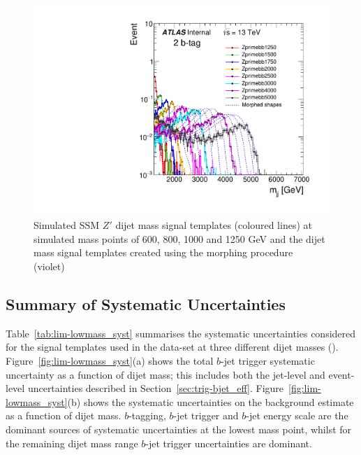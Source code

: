\begin{figure}[!ht]
\begin{center}
  \includegraphics[width=0.45\linewidth, angle=0]{figs/Dibjet/LowMass/lim-morphing.pdf} 
\end{center}
\caption[Simulated SSM $Z'$ dijet mass signal templates (coloured lines)
  at simulated mass points of 600, 800, 1000 and 1250 GeV 
  and the intermediate dijet mass signal templates created using the morphing procedure (violet).]
        {Simulated SSM $Z'$ dijet mass signal templates (coloured lines)
          at simulated mass points of 600, 800, 1000 and 1250 GeV 
          and the dijet mass signal templates created using the morphing procedure (violet)~\cite{dibjet-full_int}
          \label{fig:lim-full_morphing}}
\end{figure}




\subsection{Summary of Systematic Uncertainties}
\label{sec:lim-full_systs}

Table~\ref{tab:lim-lowmass_syst} summarises the systematic uncertainties considered for the
signal templates used in the \lm{} data-set at three different dijet masses (\mjj{}).
Figure~\ref{fig:lim-lowmass_syst}(a) shows the total $b$-jet trigger systematic uncertainty as a function of dijet  mass;
this includes both the jet-level and event-level uncertainties described in Section~\ref{sec:trig-bjet_eff}.
Figure~\ref{fig:lim-lowmass_syst}(b) shows the systematic uncertainties on the background estimate as a function of dijet  mass.
$b$-tagging, $b$-jet trigger and $b$-jet energy scale are the dominant sources of systematic uncertainties at the lowest mass point,
whilst for the remaining dijet mass range $b$-jet trigger uncertainties are dominant.

